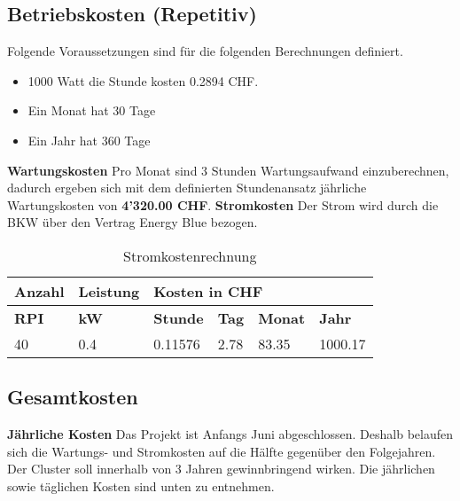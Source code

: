 \subsection{Betriebskosten (Repetitiv)}

Folgende Voraussetzungen sind für die folgenden Berechnungen definiert.
\begin{itemize}
	\item 1000 Watt die Stunde kosten 0.2894 CHF.
	\item Ein Monat hat 30 Tage
	\item Ein Jahr hat 360 Tage
\end{itemize}

\textbf{Wartungskosten}
\newline
Pro Monat sind 3 Stunden Wartungsaufwand einzuberechnen, dadurch ergeben sich mit dem definierten Stundenansatz jährliche Wartungskosten von \textbf{4'320.00 CHF}. \newline
\newline
\textbf{Stromkosten}
Der Strom wird durch die BKW über den Vertrag Energy Blue bezogen.

\begin{table}[H]
\centering
\begin{tabular}{p{1.5cm}p{2cm}|p{2.75cm}p{2.75cm}p{2.75cm}p{2.75cm}}
\hline
\rowcolor{heading} \textbf{Anzahl} & \textbf{Leistung} & \multicolumn{4}{l}{\textbf{Kosten in CHF}} \\\hline
\rowcolor{subheading} \textbf{RPI} & \textbf{kW} & \textbf{Stunde} &\textbf{Tag} & \textbf{Monat} &\textbf{Jahr} \\\hline
40 & 0.4 & 0.11576 & 2.78 & 83.35 & 1000.17 \\\hline
\end{tabular}
\caption{Stromkostenrechnung}
\end{table}

\subsection{Gesamtkosten}

\textbf{Jährliche Kosten} \newline
Das Projekt ist Anfangs Juni abgeschlossen. Deshalb belaufen sich die Wartungs- und Stromkosten auf die Hälfte gegenüber den Folgejahren.
Der Cluster soll innerhalb von 3 Jahren gewinnbringend wirken. Die jährlichen sowie täglichen Kosten sind unten zu entnehmen. 

